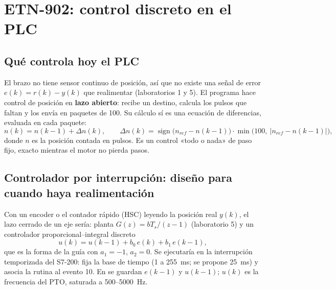 \documentclass[a4paper,11pt]{article}
\begin{document}
\section{ETN-902: control discreto en el PLC}
\subsection{Qué controla hoy el PLC}
El brazo no tiene sensor continuo de posición, así que no existe una señal de error $e(k) = r(k) - y(k)$ que realimentar (laboratorios 1 y 5). El programa  hace control de posición en \textbf{lazo abierto}: recibe un destino, calcula los pulsos que faltan y los envía en paquetes de 100. Su cálculo sí es una ecuación de diferencias, evaluada en cada paquete:
\[
n(k) = n(k-1) + \Delta n(k), \qquad \Delta n(k) = \operatorname{sign}\big(n_{ref} - n(k-1)\big)\cdot\min\big(100,\ |n_{ref} - n(k-1)|\big),
\]
donde $n$ es la posición contada en pulsos. Es un control «todo o nada» de paso fijo, exacto mientras el motor no pierda pasos.

\subsection{Controlador por interrupción: diseño para cuando haya realimentación}
Con un encoder o el contador rápido (HSC) leyendo la posición real $y(k)$, el lazo cerrado de un eje sería: planta $G(z) = bT_s/(z-1)$ (laboratorio 5) y un controlador proporcional--integral discreto
\[
u(k) = u(k-1) + b_0\,e(k) + b_1\,e(k-1),
\]
que es la forma de la guía con $a_1 = -1$, $a_2 = 0$. Se ejecutaría en la interrupción temporizada del S7-200:  fija la base de tiempo (1 a 255~ms; se propone 25~ms) y  asocia la rutina al evento 10. En  se guardan $e(k-1)$ y $u(k-1)$; $u(k)$ es la frecuencia del PTO, saturada a 500--5000~Hz.
\end{document}

